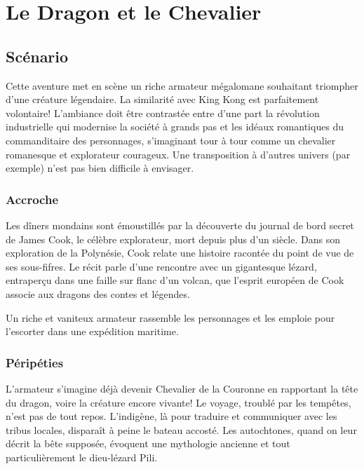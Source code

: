 \chapter{Le Dragon et le Chevalier}

\section{Scénario}

Cette aventure met en scène un riche armateur mégalomane souhaitant triompher d'une créature légendaire.
La similarité avec King Kong est parfaitement volontaire!
L'ambiance doit être contrastée entre d'une part la révolution industrielle qui modernise la société à grands pas et les idéaux romantiques du commanditaire des personnages, s'imaginant tour à tour comme un chevalier romanesque et explorateur courageux.
Une transposition à d'autres univers (\medfan par exemple) n'est pas bien difficile à envisager.

\subsection{Accroche}

Les dîners mondains sont émoustillés par la découverte du journal de bord secret de James Cook, le célèbre explorateur, mort depuis plus d'un siècle.
Dans son exploration de la Polynésie, Cook relate une histoire racontée du point de vue de ses sous-fifres.
Le récit parle d'une rencontre avec un gigantesque lézard, entraperçu dans une faille sur flanc d'un volcan, que l'esprit européen de Cook associe aux dragons des contes et légendes.

Un riche et vaniteux armateur rassemble les personnages et les emploie pour l'escorter dans une expédition maritime.

\subsection{Péripéties}

L'armateur s'imagine déjà devenir Chevalier de la Couronne en rapportant la tête du dragon, voire la créature encore vivante!
Le voyage, troublé par les tempêtes, n'est pas de tout repos.
L'indigène, là pour traduire et communiquer avec les tribus locales, disparaît à peine le bateau accosté.
Les autochtones, quand on leur décrit la bête supposée, évoquent une mythologie ancienne et tout particulièrement le dieu-lézard Pili.

